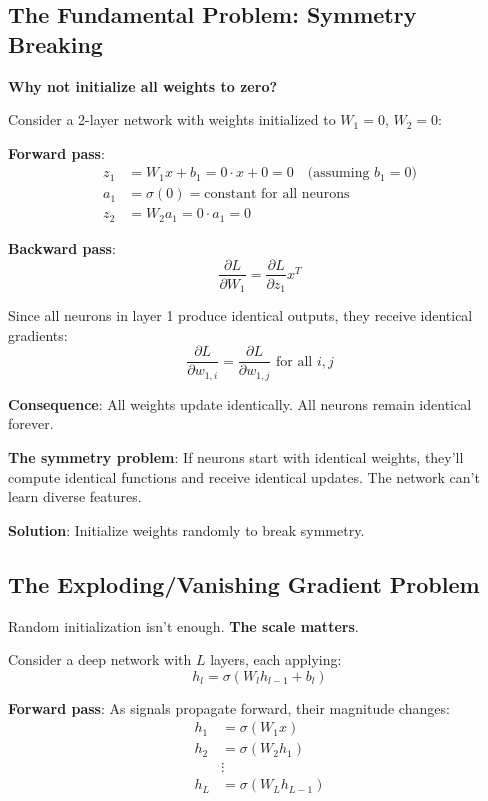\subsection{The Fundamental Problem: Symmetry Breaking}

\textbf{Why not initialize all weights to zero?}

Consider a 2-layer network with weights initialized to $W_1 = 0$, $W_2 = 0$:

\textbf{Forward pass}:
\begin{align*}
z_1 &= W_1 x + b_1 = 0 \cdot x + 0 = 0 \quad \text{(assuming } b_1 = 0\text{)} \\
a_1 &= \sigma(0) = \text{constant for all neurons} \\
z_2 &= W_2 a_1 = 0 \cdot a_1 = 0
\end{align*}

\textbf{Backward pass}:
\[
\frac{\partial L}{\partial W_1} = \frac{\partial L}{\partial z_1} x^T
\]

Since all neurons in layer 1 produce identical outputs, they receive identical gradients:
\[
\frac{\partial L}{\partial w_{1,i}} = \frac{\partial L}{\partial w_{1,j}} \text{ for all } i, j
\]

\textbf{Consequence}: All weights update identically. All neurons remain identical forever.

\textbf{The symmetry problem}: If neurons start with identical weights, they'll compute identical functions and receive identical updates. The network can't learn diverse features.

\textbf{Solution}: Initialize weights randomly to break symmetry.

\subsection{The Exploding/Vanishing Gradient Problem}

Random initialization isn't enough. \textbf{The scale matters}.

Consider a deep network with $L$ layers, each applying:
\[
h_l = \sigma(W_l h_{l-1} + b_l)
\]

\textbf{Forward pass}: As signals propagate forward, their magnitude changes:
\begin{align*}
h_1 &= \sigma(W_1 x) \\
h_2 &= \sigma(W_2 h_1) \\
&\vdots \\
h_L &= \sigma(W_L h_{L-1})
\end{align*}

